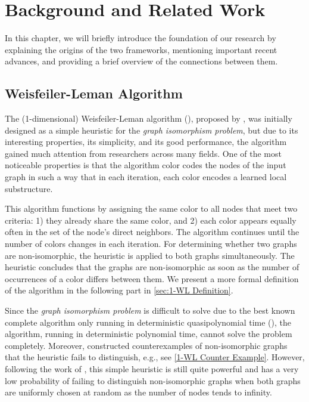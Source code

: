 \cleardoubleoddstandardpage
\chapter{Background and Related Work}\label{sec:related_work}
In this chapter, we will briefly introduce the foundation of our research by explaining the origins of the two frameworks, mentioning important recent advances, and providing a brief overview of the connections between them.

\section{Weisfeiler-Leman Algorithm}\label{sec:related_work_wl}
The (1-dimensional) Weisfeiler-Leman algorithm (\wl), proposed by \cite{Wei+1968}, was initially designed as a simple heuristic for the \textit{graph isomorphism problem}, but due to its interesting properties, its simplicity, and its good performance, the \wl algorithm gained much attention from researchers across many fields. One of the most noticeable properties is that the algorithm color codes the nodes of the input graph in such a way that in each iteration, each color encodes a learned local substructure.

This algorithm functions by assigning the same color to all nodes that meet two criteria: 1) they already share the same color, and 2) each color appears equally often in the set of the node's direct neighbors. The algorithm continues until the number of colors changes in each iteration. For determining whether two graphs are non-isomorphic, the heuristic is applied to both graphs simultaneously. The heuristic concludes that the graphs are non-isomorphic as soon as the number of occurrences of a color differs between them. We present a more formal definition of the algorithm in the following part in \cref{sec:1-WL Definition}.

Since the \textit{graph isomorphism problem} is difficult to solve due to the best known complete algorithm only running in deterministic quasipolynomial time (\cite{Babai2016}), the \wl algorithm, running in deterministic polynomial time, cannot solve the problem completely. Moreover, \cite{Cai1992} constructed counterexamples of non-isomorphic graphs that the heuristic fails to distinguish, e.g., see \cref{1-WL Counter Example}. However, following the work of \cite{Bab+1979}, this simple heuristic is still quite powerful and has a very low probability of failing to distinguish non-isomorphic graphs when both graphs are uniformly chosen at random as the number of nodes tends to infinity.

